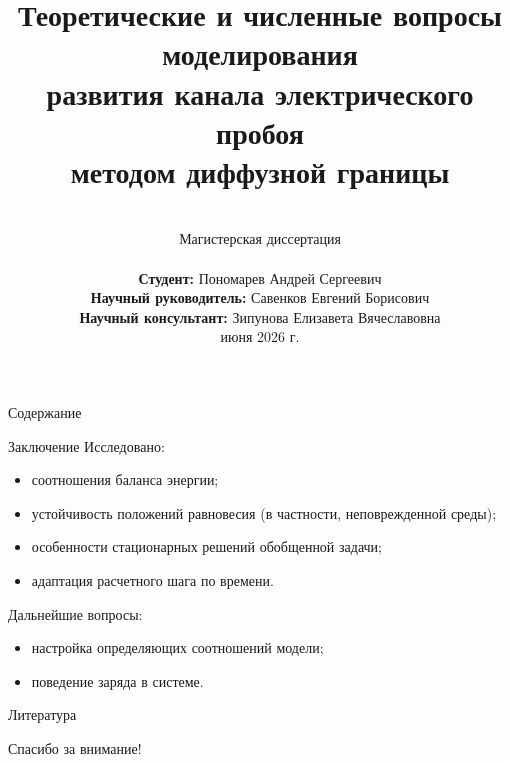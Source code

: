 \documentclass[aspectratio=169]{beamer}
\title[Электрический пробой]{Теоретические и численные вопросы моделирования \\ развития канала электрического пробоя \\ методом диффузной границы}
\author[Пономарев А. С.]{
	\hfill \\[-6mm]
	Магистерская диссертация \\[3mm]
	\raggedright
	\hspace*{7.5cm}
	\textbf{Студент:} \linebreak
	\hspace*{7.5cm}
	Пономарев Андрей Сергеевич \\[2mm]
	\hspace*{7.5cm}
	\textbf{Научный руководитель:} \linebreak
	\hspace*{7.5cm}
	Савенков Евгений Борисович \\[2mm]
	\hspace*{7.5cm}
	\textbf{Научный консультант:} \linebreak
	\hspace*{7.5cm}
	Зипунова Елизавета Вячеславовна \\[4mm]
	\centering
	22 июня 2026 г.
}
\institute[ИПМ, МФТИ]{}
\date[Магистерская диссертация]{}
\newcommand{\parind}{\hspace{7.5mm}}
\newcommand{\nologo}{\setbeamertemplate{logo}{}}
\begin{document}

\begin{frame}
\titlepage
\end{frame}

\begin{frame}{Содержание}
\Large
\tableofcontents
\end{frame}













\begin{frame}{Заключение}
\large
\parind Исследовано:
\begin{itemize}
	\item соотношения баланса энергии;
	\item устойчивость положений равновесия (в частности, неповрежденной среды);
	\item особенности стационарных решений обобщенной задачи;
	\item адаптация расчетного шага по времени.
\end{itemize}
\vspace{4mm}
\parind Дальнейшие вопросы:
\begin{itemize}
	\item настройка определяющих соотношений модели;
	\item поведение заряда в системе.
\end{itemize}
\end{frame}

{
\nologo
\begin{frame}{Литература}
\vspace*{-4mm}
\hspace*{-2mm}
\end{frame}
}

\begin{frame}{}
\begin{center}
	\Large
	Спасибо за внимание!
\end{center}
\end{frame}
\end{document}

